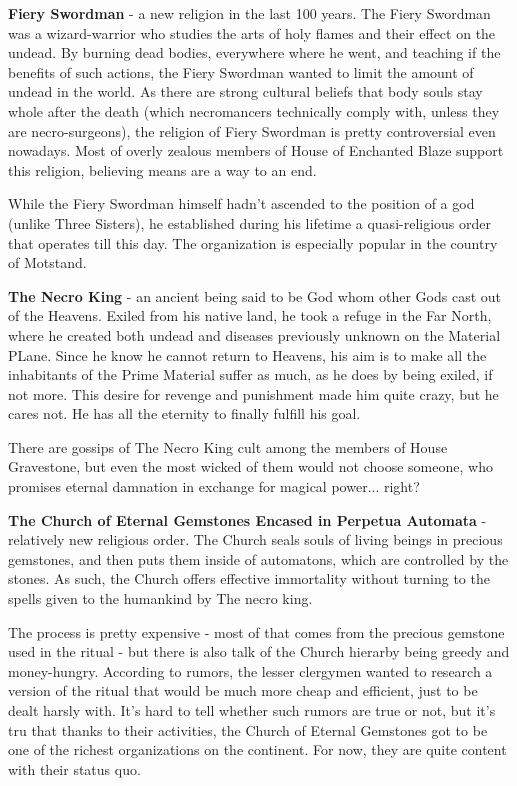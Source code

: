 \documentclass[a4paper,11pt]{article}
\begin{document}
\textbf{Fiery Swordman} - a new religion in the last 100 years. The Fiery Swordman was a wizard-warrior who studies the arts of holy flames and their effect on the undead. By burning dead bodies, everywhere where he went, and teaching if the benefits of such actions, the Fiery Swordman wanted to limit the amount of undead in the world. As there are strong cultural beliefs that body souls stay whole after the death (which necromancers technically comply with, unless they are necro-surgeons), the religion of Fiery Swordman is pretty controversial even nowadays. Most of overly zealous members of House of Enchanted Blaze support this religion, believing means are a way to an end. 

While the Fiery Swordman himself hadn't ascended to the position of a god (unlike Three Sisters), he established during his lifetime a quasi-religious order that operates till this day. The organization is especially popular in the country of Motstand.

\textbf{The Necro King} - an ancient being said to be God whom other Gods cast out of the Heavens. Exiled from his native land, he took a refuge in the Far North, where he created both undead and diseases previously unknown on the Material PLane. Since he know he cannot return to Heavens, his aim is to make all the inhabitants of the Prime Material suffer as much, as he does by being exiled, if not more. This desire for revenge and punishment made him quite crazy, but he cares not. He has all the eternity to finally fulfill his goal.

There are gossips of The Necro King cult among the members of House Gravestone, but even the most wicked of them would not choose someone, who promises eternal damnation in exchange for magical power... right?

\textbf{The Church of Eternal Gemstones Encased in Perpetua Automata} - relatively new religious order. The Church seals souls of living beings in precious gemstones, and then puts them inside of automatons, which are controlled by the stones. As such, the Church offers effective immortality without turning to the spells given to the humankind by The necro king. 

The process is pretty expensive - most of that comes from the precious gemstone used in the ritual - but there is also talk of the Church hierarby being greedy and money-hungry. According to rumors, the lesser clergymen wanted to research a version of the ritual that would be much more cheap and efficient, just to be dealt harsly with. It's hard to tell whether such rumors are true or not, but it's tru that thanks to their activities, the Church of Eternal Gemstones got to be one of the richest organizations on the continent. For now, they are quite content with their status quo.
\end{document}

